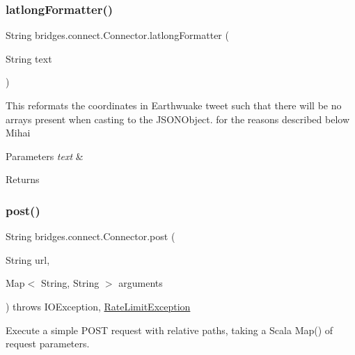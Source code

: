 \subsubsection{\texorpdfstring{latlong\+Formatter()}{latlongFormatter()}}
{\footnotesize\ttfamily String bridges.\+connect.\+Connector.\+latlong\+Formatter (\begin{DoxyParamCaption}\item[{String}]{text }\end{DoxyParamCaption})}

This reformats the coordinates in Earthwuake tweet such that there will be no arrays present when casting to the J\+S\+O\+N\+Object. for the reasons described below Mihai 
\begin{DoxyParams}{Parameters}
{\em text} & \\
\hline
\end{DoxyParams}
\begin{DoxyReturn}{Returns}

\end{DoxyReturn}
\mbox{\label{classbridges_1_1connect_1_1_connector_a88e465aed707d59b96958dcc946ff6b4}} 
\subsubsection{\texorpdfstring{post()}{post()}\hspace{0.1cm}{\footnotesize\ttfamily [1/2]}}
{\footnotesize\ttfamily String bridges.\+connect.\+Connector.\+post (\begin{DoxyParamCaption}\item[{String}]{url,  }\item[{Map$<$ String, String $>$}]{arguments }\end{DoxyParamCaption}) throws I\+O\+Exception, \hyperlink{classbridges_1_1validation_1_1_rate_limit_exception}{Rate\+Limit\+Exception}}

Execute a simple P\+O\+ST request with relative paths, taking a Scala Map() of request parameters. \mbox{\label{classbridges_1_1connect_1_1_connector_a4b8978743a8c230b86500f5a00cb2697}} 
